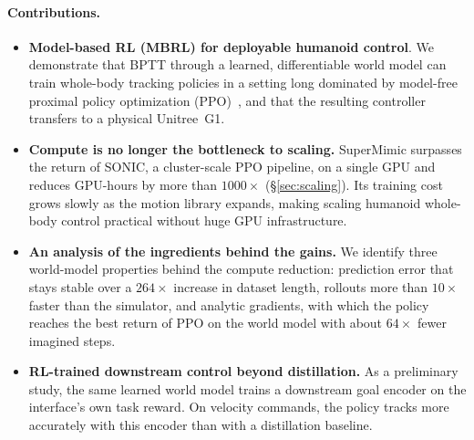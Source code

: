 \paragraph{Contributions.}
\begin{itemize}[leftmargin=*,noitemsep,topsep=2pt]
  \item \textbf{Model-based RL (MBRL) for deployable humanoid control}. We demonstrate that BPTT through a learned, differentiable world model can train whole-body tracking policies in a setting long dominated by model-free proximal policy optimization (PPO)~\citep{schulman2017proximal}, and that the resulting controller transfers to a physical Unitree~G1.
  \item \textbf{Compute is no longer the bottleneck to scaling.} SuperMimic surpasses the return of SONIC, a cluster-scale PPO pipeline, on a single GPU and reduces GPU-hours by more than $1000\times$ (\hyperref[par:accounting]{\S\ref*{sec:scaling}}). Its training cost grows slowly as the motion library expands, making scaling humanoid whole-body control practical without huge GPU infrastructure.
  \item \textbf{An analysis of the ingredients behind the gains.} We identify three world-model properties behind the compute reduction: prediction error that stays stable over a $264\times$ increase in dataset length, rollouts more than $10\times$ faster than the simulator, and analytic gradients, with which the policy reaches the best return of PPO on the world model with about $64\times$ fewer imagined steps.
  \item \textbf{RL-trained downstream control beyond distillation.} As a preliminary study, the same learned world model trains a downstream goal encoder on the interface's own task reward. On velocity commands, the policy tracks more accurately with this encoder than with a distillation baseline.
\end{itemize}
